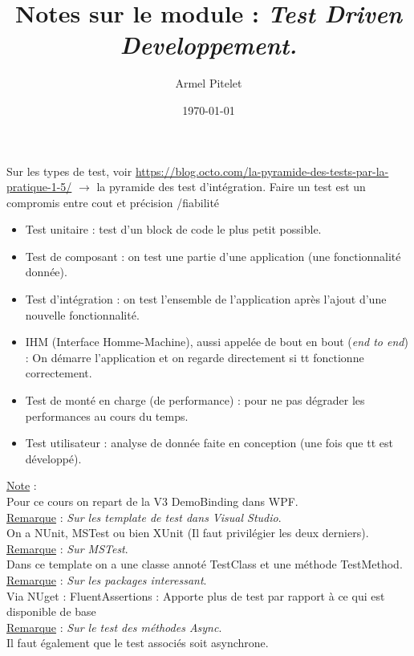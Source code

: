 \documentclass[a4paper,12pt,twoside]{article}
\title{Notes sur le module : \textit{Test Driven Developpement.}}
\author{Armel Pitelet}
\date{\today}
\newcommand{\incode}[1]{{\footnotesize\ttfamily #1}} %
\newcommand{\rem}[2]{\noindent\underline{Remarque} : \textit{#1}.\\ \indent #2}
\newcommand{\note}[1]{\noindent\underline{Note} : \\ \indent #1}
\begin{document}
\maketitle
\tableofcontents

Sur les types de test, voir \url{https://blog.octo.com/la-pyramide-des-tests-par-la-pratique-1-5/} $\to$ la pyramide des test d'intégration. Faire un test est un compromis entre cout et précision /fiabilité
\begin{itemize}
\item Test unitaire : test d'un block de code le plus petit possible.
\item Test de composant : on test une partie d'une application (une fonctionnalité donnée).
\item Test d'intégration : on test l'ensemble de l'application après l'ajout d'une nouvelle fonctionnalité.
\item IHM (Interface Homme-Machine), aussi appelée de bout en bout (\textit{end to end}) : On démarre l'application et on regarde directement si tt fonctionne correctement.
\item Test de monté en charge (de performance) : pour ne pas dégrader les performances au cours du temps.
\item Test utilisateur : analyse de donnée faite en conception (une fois que tt est développé).\\
\end{itemize}


\note{Pour ce cours on repart de la V3 DemoBinding dans WPF.}\\

\rem{Sur les template de test dans Visual Studio}{On a NUnit, MSTest ou bien XUnit (Il faut privilégier les deux derniers).}\\

\rem{Sur MSTest}{Dans ce template on a une classe annoté \incode{TestClass} et une méthode \incode{TestMethod}.}\\

\rem{Sur les packages interessant}{Via NUget : FluentAssertions : Apporte plus de test par rapport à ce qui est disponible de base}\\

\rem{Sur le test des méthodes Async}{Il faut également que le test associés soit asynchrone.}\\
\end{document}

